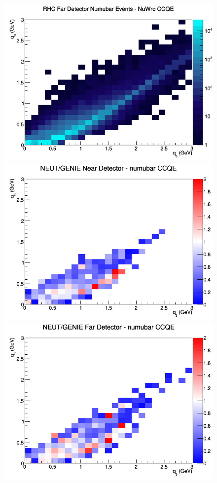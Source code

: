 \documentclass[12pt]{article}
\begin{document}
\begin{figure}[h]
\endminipage
{}
\includegraphics[width=\linewidth]{eff_q0_q3/GAr/CCQE_RHC_FD_numubar_q3_q0_NuWro.png}
\endminipage
\newline
{}
\includegraphics[width=\linewidth]{eff_q0_q3/GAr/ratios/CCQE_NEUT_GENIE_numubar_near_q3_q0.png}
\endminipage
{}
\includegraphics[width=\linewidth]{eff_q0_q3/GAr/ratios/CCQE_NEUT_GENIE_numubar_far_q3_q0.png}

\end{figure}
\end{document}
